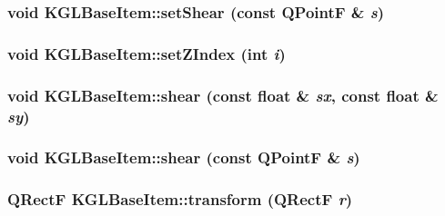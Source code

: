 \hypertarget{class_k_g_l_base_item_c66fae31fcfb2261694c8ec120cb314c}{
\subsubsection[{setShear}]{\setlength{\rightskip}{0pt plus 5cm}void KGLBaseItem::setShear (const QPointF \& {\em s})}}
\label{class_k_g_l_base_item_c66fae31fcfb2261694c8ec120cb314c}


\hypertarget{class_k_g_l_base_item_e29dcbe6e797fd4c6aef59acadb5ba48}{
\subsubsection[{setZIndex}]{\setlength{\rightskip}{0pt plus 5cm}void KGLBaseItem::setZIndex (int {\em i})}}
\label{class_k_g_l_base_item_e29dcbe6e797fd4c6aef59acadb5ba48}


\hypertarget{class_k_g_l_base_item_a81489bbb8b7ebe54129eab7b56d8b1a}{
\subsubsection[{shear}]{\setlength{\rightskip}{0pt plus 5cm}void KGLBaseItem::shear (const float \& {\em sx}, \/  const float \& {\em sy})}}
\label{class_k_g_l_base_item_a81489bbb8b7ebe54129eab7b56d8b1a}


\hypertarget{class_k_g_l_base_item_a7cb811a03472f52dd7f6090a305bc30}{
\subsubsection[{shear}]{\setlength{\rightskip}{0pt plus 5cm}void KGLBaseItem::shear (const QPointF \& {\em s})}}
\label{class_k_g_l_base_item_a7cb811a03472f52dd7f6090a305bc30}


\hypertarget{class_k_g_l_base_item_fd255933afb0b5eb06de5ac1358f7e24}{
\subsubsection[{transform}]{\setlength{\rightskip}{0pt plus 5cm}QRectF KGLBaseItem::transform (QRectF {\em r})}}
\label{class_k_g_l_base_item_fd255933afb0b5eb06de5ac1358f7e24}


